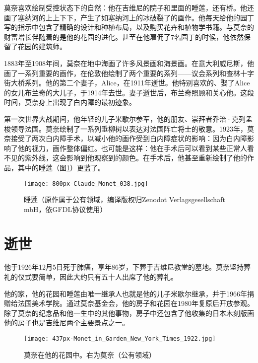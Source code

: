         莫奈喜欢绘制受控状态下的自然：他在吉维尼的院子和里面的睡莲，还有桥。他还画了塞纳河的上上下下，产生了如塞纳河上的冰破裂了的画作。他每天给他的园丁写的指示中包含了精确的设计和种植布局，以及购买花卉和植物学书籍。与莫奈的财富增长伴随着的是他的花园的进化。甚至在他雇佣了7名园丁的时候，他依然保留了花园的建筑师。
        
        1883年至1908年间，莫奈在地中海画了许多风景画和海景画。在意大利威尼斯，他画了一系列重要的画作，在伦敦他绘制了两个重要的系列——议会系列和查林十字街大桥系列。他的第二个妻子，Alice，在1911年逝世。他特别喜欢的、娶了Alice的女儿布兰奇的大儿子，于1914年去世。妻子逝世后，布兰奇照顾和关心他。这段时间，莫奈身上出现了白内障的最初迹象。
        
        第一次世界大战期间，他年轻的儿子米歇尔参军，他的朋友、崇拜者乔治·克列孟梭领导法国。莫奈绘制了一系列垂柳树以表达对法国阵亡将士的敬意。1923年，莫奈接受了两次白内障手术，以减小他的画作受到白内障症状的影响：因为白内障影响了他的视力，画作整体偏红。也可能是这样：他在手术后可以看到某些正常人看不见的紫外线，这会影响到他观察到的颜色。在手术后，他甚至重新绘制了他的作品，其中的睡莲（图\ref{fig:water-lilies}）更蓝了。


        \begin{figure}[h!]
          \centering
          \texttt{[image: 800px-Claude\_Monet\_038.jpg]}
          \caption{睡莲（原作属于公有领域，编译版权归Zenodot Verlagsgesellschaft mbH，依GFDL协议使用）}
          \label{fig:water-lilies}
        \end{figure}
        
    \section{逝世}
    
        他于1926年12月5日死于肺癌，享年86岁，下葬于吉维尼教堂的墓地。莫奈坚持葬礼的仪式要简单，因此大约只有五十人出席了他的葬礼。
        
        他的家，他的花园和睡莲由唯一继承人也就是他的儿子米歇尔继承，并于1966年捐赠给法国美术学院。通过莫奈基金会，他的房子和花园在1980年复原后开放参观。除了莫奈的纪念品和他一生中的其他事物，房子中还包含了他收集的日本木刻版画他的房子也是吉维尼两个主要景点之一。

        \begin{figure}[h!]
          \centering
          \texttt{[image: 437px-Monet\_in\_Garden\_New\_York\_Times\_1922.jpg]}
          \caption{莫奈在他的花园中。右为莫奈（公有领域）}
          \label{fig:monet-in-gardon}
        \end{figure}


